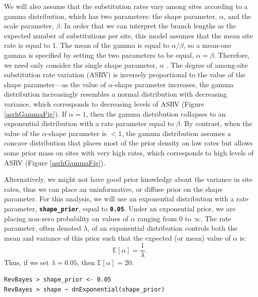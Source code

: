 \documentclass[11pt]{article}
\newcommand{\cl}[1]{{\texttt{\textbf{#1}}}}
\begin{document}
We will also assume that the substitution rates vary among sites according to a gamma distribution, which has two parameters: the shape parameter, $\alpha$, and the scale parameter, $\beta$. 
In order that we can interpret the branch lengths as the expected number of substitutions per site, this model assumes that the mean site rate is equal to 1.
The mean of the gamma is equal to $\alpha/\beta$, so a mean-one gamma is specified by setting the two parameters to be equal, $\alpha=\beta$.
Therefore, we need only consider the single shape parameter, $\alpha$ \citep{yang94a}. 
The degree of among-site substitution rate variation (ASRV) is inversely proportional to the value of the shape parameter---as the value of $\alpha$-shape parameter increases, the gamma distribution increasingly resembles a normal distribution with decreasing variance, which corresponds to decreasing levels of ASRV (Figure \ref{asrhGammaFig}).
If $\alpha = 1$, then the gamma distribution collapses to an exponential distribution with a rate parameter equal to $\beta$.
By contrast, when the value of the $\alpha$-shape parameter is $< 1$, the gamma distribution assumes a concave distribution that places most of the prior density on low rates but allows some prior mass on sites with very high rates, which corresponds to high levels of ASRV (Figure \ref{asrhGammaFig}).

Alternatively, we might not have good prior knowledge about the variance in site rates, thus we can place an uninformative, or diffuse prior on the shape parameter.
For this analysis, we will use an exponential distribution with a rate parameter, \cl{shape\_prior}, equal to \cl{0.05}.
Under an exponential prior, we are placing non-zero probability on values of $\alpha$ ranging from 0 to $\infty$. 
The rate parameter, often denoted $\lambda$, of an exponential distribution controls both the mean and variance of this prior such that the expected (or mean) value of $\alpha$ is:
$$\mathbb{E}[\alpha] = \frac{1}{\lambda}.$$
Thus, if we set $\lambda=0.05$, then $\mathbb{E}[\alpha] = 20$.

{\tt\begin{snugshade*}
\begin{lstlisting}
RevBayes > shape_prior <- 0.05                                                                             
RevBayes > shape ~ dnExponential(shape_prior)
\end{lstlisting}
\end{snugshade*}}
\end{document}
